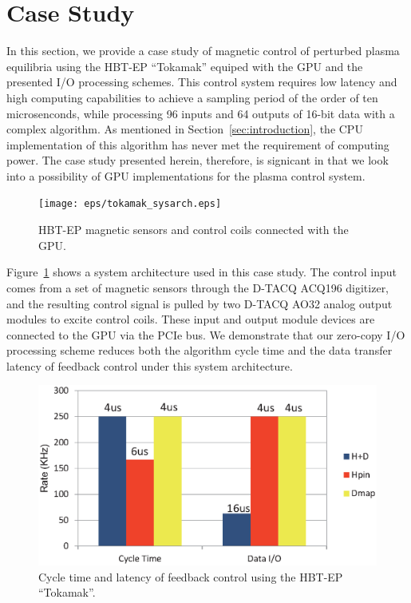 \section{Case Study}
\label{sec:case_study}

In this section, we provide a case study of magnetic control of
perturbed plasma equilibria using the HBT-EP ``Tokamak'' equiped with
the GPU and the presented I/O processing schemes.
This control system requires low latency and high computing capabilities
to achieve a sampling period of the order of ten microsenconds, while
processing 96 inputs and 64 outputs of 16-bit data with a complex
algorithm.
As mentioned in Section~\ref{sec:introduction}, the CPU implementation
of this algorithm has never met the requirement of computing power.
The case study presented herein, therefore, is signicant in that we look
into a possibility of GPU implementations for the plasma control system.

\begin{figure}[t]
 \centering
 \texttt{[image: eps/tokamak\_sysarch.eps]}
 \caption{HBT-EP magnetic sensors and control coils connected with the
 GPU.}
 \label{fig:tokamak_sysarch}
\end{figure}

Figure~\ref{fig:tokamak_sysarch} shows a system architecture used in
this case study.
The control input comes from a set of magnetic sensors through the
D-TACQ ACQ196 digitizer, and the resulting control signal is pulled by
two D-TACQ AO32 analog output modules to excite control coils.
These input and output module devices are connected to the GPU via the
PCIe bus.
We demonstrate that our zero-copy I/O processing scheme reduces both
the algorithm cycle time and the data transfer latency of feedback
control under this system architecture.

\begin{figure}[t]
 \centering
 \includegraphics[width=\hsize]{eps/eval_plasma.eps}
 \caption{Cycle time and latency of feedback control using the HBT-EP
 ``Tokamak''.}
 \label{fig:eval_plasma}
\end{figure}

